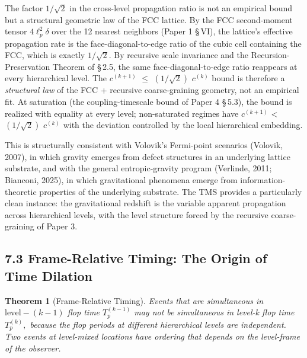 \documentclass[11pt,oneside]{report}
\newtheorem{theorem}{Theorem}[section]
\theoremstyle{definition}
\theoremstyle{remark}
\begin{document}
The factor \ensuremath{1/\sqrt{2}} in the cross-level propagation ratio is not an empirical
bound but a structural geometric law of the FCC lattice. By the FCC
second-moment tensor \ensuremath{4\ell^{2}_{p}\delta} over the 12 nearest neighbors (Paper 1 \S\,VI),
the lattice's effective propagation rate is the face-diagonal-to-edge
ratio of the cubic cell containing the FCC, which is exactly \ensuremath{1/\sqrt{2}.} By
recursive scale invariance and the Recursion-Preservation Theorem of
\S\,2.5, the same face-diagonal-to-edge ratio reappears at every
hierarchical level. The \ensuremath{c^{(k+1)}} \ensuremath{\leq} \ensuremath{(1/\sqrt{2})} \ensuremath{c^{(k)}} bound is therefore a
\emph{structural law} of the FCC + recursive coarse-graining geometry,
not an empirical fit. At saturation (the coupling-timescale bound of
Paper 4 \S\,5.3), the bound is realized with equality at every level;
non-saturated regimes have \ensuremath{c^{(k+1)}} \textless{} \ensuremath{(1/\sqrt{2})} \ensuremath{c^{(k)}} with the
deviation controlled by the local hierarchical embedding.

This is structurally consistent with Volovik's Fermi-point scenarios
(Volovik, 2007), in which gravity emerges from defect structures in an
underlying lattice substrate, and with the general entropic-gravity
program (Verlinde, 2011; Bianconi, 2025), in which gravitational
phenomena emerge from information-theoretic properties of the underlying
substrate. The TMS provides a particularly clean instance: the
gravitational redshift is the variable apparent propagation across
hierarchical levels, with the level structure forced by the recursive
coarse-graining of Paper 3.

\subsection*{7.3 Frame-Relative Timing: The Origin of Time Dilation}

\begin{theorem}[Frame-Relative Timing]
Events that are simultaneous
in \ensuremath{\text{level}-(k-1)} flop time \ensuremath{T_{p}^{(k-1)}} may not be simultaneous in
level-k flop time \ensuremath{T_{p}^{(k)},} because the flop periods at different
hierarchical levels are independent. Two events at level-mixed locations
have ordering that depends on the level-frame of the observer.
\end{theorem}
\end{document}
